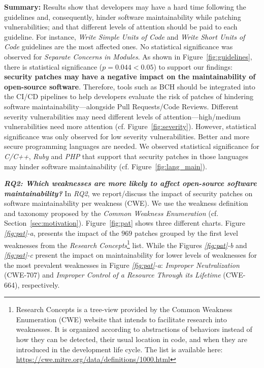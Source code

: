 \documentclass[smallextended]{svjour3}       %
\begin{document}
\textbf{Summary:} Results show that developers may have a
hard time following the guidelines and, consequently, hinder
software maintainability while patching vulnerabilities; and that different levels of
attention should be paid to each guideline. For instance,
\emph{Write Simple Units of Code} and \emph{Write Short Units of Code}
guidelines are the most affected ones. No statistical significance was observed
for \emph{Separate Concerns in Modules}.
As shown in Figure~\ref{fig:guidelines}, there is statistical significance ($p=0.044 < 0.05$) to support our findings: \textbf{security patches
may have a negative impact on the maintainability of open-source software}. Therefore, tools such as BCH should be integrated into the CI/CD pipelines
to help developers evaluate the risk of patches of hindering software maintainability---alongside
Pull Requests/Code Reviews. Different severity
vulnerabilities may need different levels of attention---high/medium vulnerabilities need more attention (cf. Figure~\ref{fig:severity}). However, statistical significance was only observed for low severity vulnerabilities. Better and more secure programming languages are needed. We observed statistical significance for \emph{C/C++}, \emph{Ruby} and \emph{PHP} that support that security patches in those languages may hinder software maintainability (cf. Figure~\ref{fig:lang_main}).
%

\textit{\textbf{RQ2: Which weaknesses are more likely to
affect open-source software maintainability?}}
In \emph{RQ2}, we report/discuss the impact of security patches on
software maintainability per weakness (CWE). We use the weakness definition
and taxonomy proposed by the \emph{Common Weakness Enumeration} (cf. Section~\ref{sec:motivation}).
Figure~\ref{fig:pat} shows three different charts. Figure \emph{\ref{fig:pat}-a}, presents
the impact of the $969$ patches grouped by the first level weaknesses from
the \emph{Research Concepts}\footnote{Research Concepts 
 is a tree-view provided by the Common Weakness Enumeration (CWE) website 
 that intends to facilitate research into weaknesses. It is organized 
 according to 
 abstractions of behaviors instead of how they can be detected, 
 their usual location in code, and when they are introduced in the 
 development life cycle. The list is available here: \url{https://cwe.mitre.org/data/definitions/1000.html}
} list. While the Figures \emph{\ref{fig:pat}-b} and
\emph{\ref{fig:pat}-c} present the impact on maintainability for lower levels of 
weaknesses for the most prevalent weaknesses in Figure \emph{\ref{fig:pat}-a}:
\emph{Improper Neutralization} (CWE-707) 
and \emph{Improper Control of a Resource 
Through its Lifetime} (CWE-664), respectively.
\end{document}
